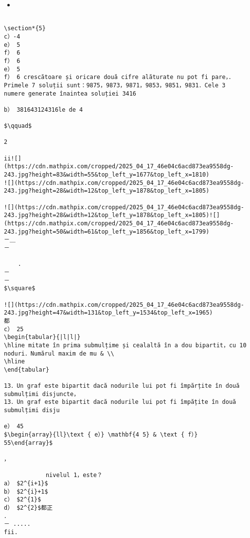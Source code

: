 \begin{itemize}
  \item 
\end{itemize}

\begin{verbatim}

\section*{5}
c）-4
e） 5
f） 6
f） 6
e） 5
f） 6 crescătoare și oricare două cifre alăturate nu pot fi pare，．Primele 7 soluții sunt：9875，9873，9871，9853，9851，9831．Cele 3 numere generate înaintea soluției 3416

b） 381643124316le de 4
                    
$\qquad$
                                                                                                    2
                                                                                        ii![](https://cdn.mathpix.com/cropped/2025_04_17_46e04c6acd873ea9558dg-243.jpg?height=83&width=55&top_left_y=1677&top_left_x=1810)
![](https://cdn.mathpix.com/cropped/2025_04_17_46e04c6acd873ea9558dg-243.jpg?height=28&width=12&top_left_y=1878&top_left_x=1805)

![](https://cdn.mathpix.com/cropped/2025_04_17_46e04c6acd873ea9558dg-243.jpg?height=28&width=12&top_left_y=1878&top_left_x=1805)![](https://cdn.mathpix.com/cropped/2025_04_17_46e04c6acd873ea9558dg-243.jpg?height=50&width=61&top_left_y=1856&top_left_x=1799)
－＿
－

    .
－
－
$\square$

![](https://cdn.mathpix.com/cropped/2025_04_17_46e04c6acd873ea9558dg-243.jpg?height=47&width=131&top_left_y=1534&top_left_x=1965)
都
c） 25
\begin{tabular}{|l|l|}
\hline mitate în prima submulțime și cealaltă în a dou bipartit，cu 10 noduri．Numărul maxim de mu & \\
\hline
\end{tabular}

13．Un graf este bipartit dacă nodurile lui pot fi împărțite în două submulțimi disjuncte，
13．Un graf este bipartit dacă nodurile lui pot fi împățite în două submulțimi disju

e） 45
$\begin{array}{ll}\text { e）} \mathbf{4 5} & \text { f）} 55\end{array}$
 
，

            nivelul 1，este？
a） $2^{i+1}$
b） $2^{i}+1$
c） $2^{1}$
d） $2^{2}$都正
．
－ ..... 
fii.


\end{verbatim}
